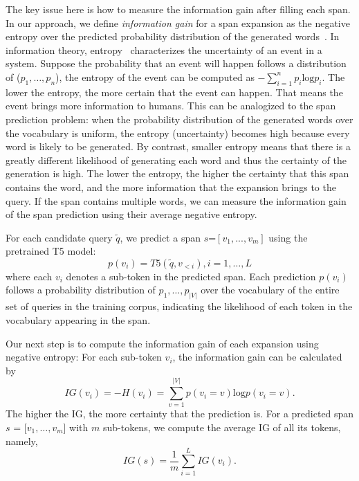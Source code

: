 \documentclass[sigconf,screen]{acmart}
\begin{document}
The key issue here is how to measure the information gain after filling each span. In our approach, we define \emph{information gain} for a span expansion as the negative entropy over the predicted probability distribution of the generated words~\cite{jiang2015relative, luukka2011feature}. In information theory, entropy~\cite{renyi1961measures} characterizes the uncertainty of an event in a system. Suppose the probability that an event will happen follows a distribution of ($p_1,\ldots,p_n$), the entropy of the event can be computed as $-\sum_{i=1}^np_i\mathrm{log}p_i$. The lower the entropy, the more certain that the event can happen. That means the event brings more information to humans.
This can be analogized to the span prediction problem: when the probability distribution of the generated words over the vocabulary is uniform, the entropy (uncertainty) becomes high because every word is likely to be generated. By contrast, smaller entropy means that there is a greatly different likelihood of generating each word and thus the certainty of the generation is high. The lower the entropy, the higher the certainty that this span contains the word, and the more information that the expansion brings to the query.
If the span contains multiple words, we can measure the information gain of the span prediction using their average negative entropy.  

For each candidate query $\tilde{q}$, we predict a span $s$=$[v_1,...,v_m]$ using the pretrained T5 model: 
\begin{equation}
p(v_i)=T5(\tilde{q}, v_{<i}), i=1,\ldots,L
\end{equation}
where each $v_i$ denotes a sub-token in the predicted span.
Each prediction $p(v_i)$ follows a probability distribution of $p_1,\ldots,p_{|V|}$ over the vocabulary of the entire set of queries in the training corpus, indicating the likelihood of each token in the vocabulary appearing in the span. 

Our next step is to compute the information gain of each expansion using negative entropy: For each sub-token $v_i$, the information gain can be calculated by 
\begin{equation}
IG(v_i) = -H(v_i)=\sum_{v=1}^{|V|}p(v_i=v)\mathrm{log} p(v_i=v). 
\end{equation}
The higher the IG, the more certainty that the prediction is. For a predicted span $s$ = [$v_1,\ldots,v_m$] with $m$ sub-tokens, we compute the average IG of all its tokens, namely, 
\begin{equation}
IG(s) = \frac{1}{m}\sum_{i=1}^LIG(v_i). 
\end{equation}
\end{document}
